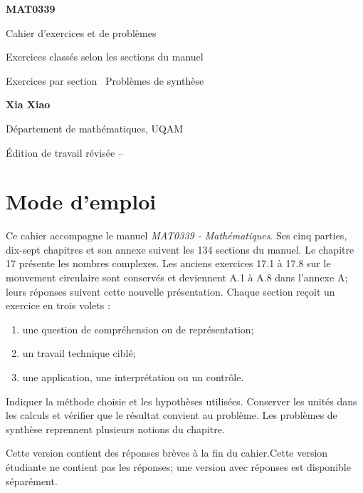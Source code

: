 \color{ink}\frontmatter
\begin{titlepage}\centering
\vspace*{2.1cm}
{\Huge\sffamily\bfseries\color{navy} MAT0339\par}\vspace{0.3cm}
{\LARGE\sffamily\color{ink} Cahier d'exercices et de problèmes\par}\vspace{0.65cm}
{\large\sffamily\color{teal} Exercices classés selon les sections du manuel\par}\vspace{1.3cm}
\begin{tcolorbox}[width=0.76\textwidth,colback=mistteal,borderline west={3pt}{0pt}{teal}]
\centering\sffamily
Exercices par section \textbullet\ Problèmes de synthèse
\end{tcolorbox}
\vfill
{\Large\sffamily\bfseries\color{navy} Xia Xiao\par}\vspace{0.2cm}
{\large\sffamily\color{slate} Département de mathématiques, UQAM\par}\vspace{0.7cm}
{\large\sffamily\color{teal} Édition de travail révisée -- \EditionDate{}\par}
\end{titlepage}
\chapter*{Mode d'emploi}
Ce cahier accompagne le manuel \emph{MAT0339 - Mathématiques}. Ses cinq parties, dix-sept chapitres et son annexe suivent les 134 sections du manuel. Le chapitre 17 présente les nombres complexes. Les anciens exercices 17.1 à 17.8 sur le mouvement circulaire sont conservés et deviennent A.1 à A.8 dans l'annexe A; leurs réponses suivent cette nouvelle présentation. Chaque section reçoit un exercice en trois volets :
\begin{enumerate}
\item une question de compréhension ou de représentation;
\item un travail technique ciblé;
\item une application, une interprétation ou un contrôle.
\end{enumerate}
\begin{designbox}
Indiquer la méthode choisie et les hypothèses utilisées. Conserver les unités dans les calculs et vérifier que le résultat convient au problème. Les problèmes de synthèse reprennent plusieurs notions du chapitre.
\end{designbox}
\ifcorrige Cette version contient des réponses brèves à la fin du cahier.\else Cette version étudiante ne contient pas les réponses; une version avec réponses est disponible séparément.\fi
\tableofcontents\mainmatter
